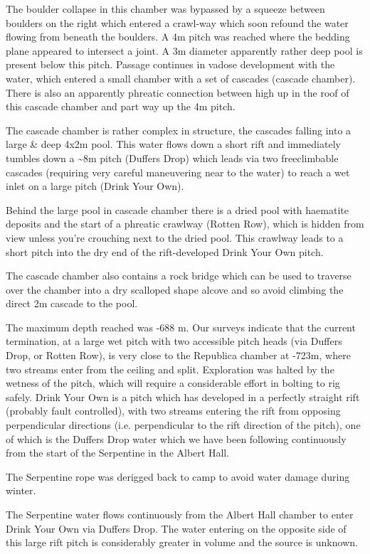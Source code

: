The boulder collapse in this chamber was bypassed by a squeeze between
boulders on the right which entered a crawl-way which soon refound the
water flowing from beneath the boulders. A 4m pitch was reached where
the bedding plane appeared to intersect a joint. A 3m diameter
apparently rather deep pool is present below this pitch. Passage
continues in vadose development with the water, which entered a small
chamber with a set of cascades (cascade chamber). There is also an
apparently phreatic connection between high up in the roof of this
cascade chamber and part way up the 4m pitch.

The cascade chamber is rather complex in structure, the cascades falling
into a large \& deep 4x2m pool. This water flows down a short rift and
immediately tumbles down a \textasciitilde{}8m pitch (Duffers Drop)
which leads via two freeclimbable cascades (requiring very careful
maneuvering near to the water) to reach a wet inlet on a large pitch
(Drink Your Own).

Behind the large pool in cascade chamber there is a dried pool with
haematite deposits and the start of a phreatic crawlway (Rotten Row),
which is hidden from view unless you're crouching next to the dried
pool. This crawlway leads to a short pitch into the dry end of the
rift-developed Drink Your Own pitch.

The cascade chamber also contains a rock bridge which can be used to
traverse over the chamber into a dry scalloped shape alcove and so avoid
climbing the direct 2m cascade to the pool.

The maximum depth reached was -688 m. Our surveys indicate that the
current termination, at a large wet pitch with two accessible pitch
heads (via Duffers Drop, or Rotten Row), is very close to the Republica
chamber at -723m, where two streams enter from the ceiling and split.
Exploration was halted by the wetness of the pitch, which will require a
considerable effort in bolting to rig safely. Drink Your Own is a pitch
which has developed in a perfectly straight rift (probably fault
controlled), with two streams entering the rift from opposing
perpendicular directions (i.e. perpendicular to the rift direction of
the pitch), one of which is the Duffers Drop water which we have been
following continuously from the start of the Serpentine in the Albert
Hall.

The Serpentine rope was derigged back to camp to avoid water damage
during winter.

The Serpentine water flows continuously from the Albert Hall chamber to
enter Drink Your Own via Duffers Drop. The water entering on the
opposite side of this large rift pitch is considerably greater in volume
and the source is unknown.

